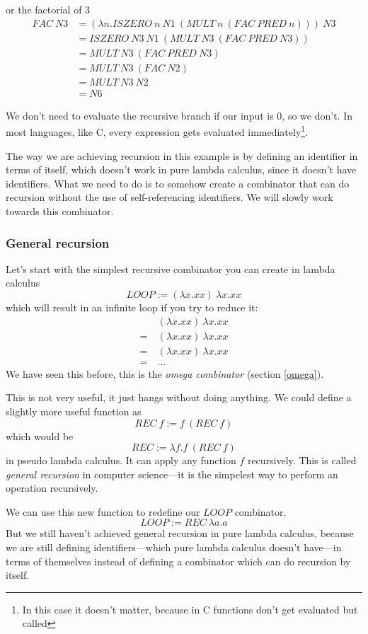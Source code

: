 \documentclass[11pt]{article}
\begin{document}
or the factorial of 3
\begin{align*}
	FAC\ N3&=(\lambda n.ISZERO\ n\ N1\ (MULT\ n\ (FAC\ PRED\ n)))\ N3\\
	&=ISZERO\ N3\ N1\ (MULT\ N3\ (FAC\ PRED\ N3))\\
	&=MULT\ N3\ (FAC\ PRED\ N3)\\
	&=MULT\ N3\ (FAC\ N2)\\
	&=MULT\ N3\ N2\\
	&=N6
\end{align*}

We don't need to evaluate the recursive branch if our input is 0, so we don't.
In most languages, like C, every expression gets evaluated
immediately\footnote{In this case it doesn't matter, because in C functions
don't get evaluated but called}.

The way we are achieving recursion in this example is by defining an identifier
in terms of itself, which doesn't work in pure lambda calculus, since it
doesn't have identifiers. What we need to do is to somehow create a combinator
that can do recursion without the use of self-referencing identifiers. We will
slowly work towards this combinator.

\subsubsection{General recursion}\label{general_recursion}

Let's start with the simplest recursive combinator you can create in lambda
calculus
\[LOOP:=(\lambda x.xx)\ \lambda x.xx\]
which will result in an infinite loop if you try to reduce it:
\begin{align*}
	&(\lambda x.xx)\ \lambda x.xx \\
	=\ &(\lambda x.xx)\ \lambda x.xx \\
	=\ &(\lambda x.xx)\ \lambda x.xx \\
	=\ & ...
\end{align*}
We have seen this before, this is the \emph{omega combinator} (section
\ref{omega}).

This is not very useful, it just hangs without doing anything. We could define
a slightly more useful function as
\[REC\ f:=f\ (REC\ f)\]
which would be
\[REC:=\lambda f.f\ (REC\ f)\]
in pseudo lambda calculus. It can apply any function \(f\) recursively. This is
called \emph{general recursion} in computer science---it is the simpelest way to
perform an operation recursively.

We can use this new function to redefine our \(LOOP\) combinator.
\[LOOP:=REC\ \lambda a.a\]
But we still haven't achieved general recursion in pure lambda calculus,
because we are still defining identifiers---which pure lambda calculus doesn't
have---in terms of themselves instead of defining a combinator which can do
recursion by itself.
\end{document}
